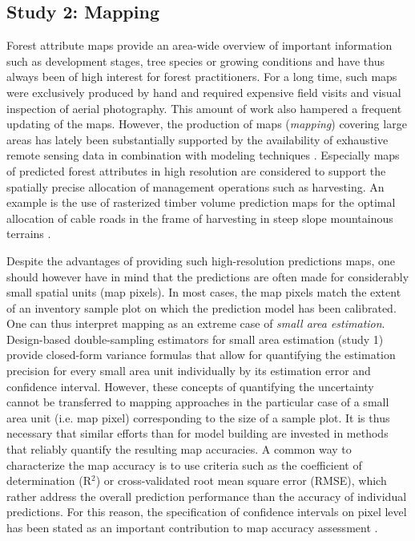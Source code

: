 \subsection{Study 2: Mapping} %
\label{sec:study2}


Forest attribute maps provide an area-wide overview of important information such as development stages, tree species or growing conditions and have thus always been of high interest for forest practitioners. For a long time, such maps were exclusively produced by hand and required expensive field visits and visual inspection of aerial photography. This amount of work also hampered a frequent updating of the maps. However, the production of maps (\textit{mapping}) covering large areas has lately been substantially supported by the availability of exhaustive remote sensing data in combination with modeling techniques \citep{brosofske2014}. Especially maps of predicted forest attributes in high resolution are considered to support the spatially precise allocation of management operations such as harvesting. An example is the use of rasterized timber volume prediction maps for the optimal allocation of cable roads in the frame of harvesting in steep slope mountainous terrains \citep{bont2012, bont2015}.\par

Despite the advantages of providing such high-resolution predictions maps, one should however have in mind that the predictions are often made for considerably small spatial units (map pixels). In most cases, the map pixels match the extent of an inventory sample plot on which the prediction model has been calibrated. One can thus interpret mapping as an extreme case of \textit{small area estimation}. Design-based double-sampling estimators for small area estimation (study 1) provide closed-form variance formulas that allow for quantifying the estimation precision for every small area unit individually by its estimation error and confidence interval. However, these concepts of quantifying the uncertainty cannot be transferred to mapping approaches in the particular case of a small area unit (i.e. map pixel) corresponding to the size of a sample plot. It is thus necessary that similar efforts than for model building are invested in methods that reliably quantify the resulting map accuracies. A common way to characterize the map accuracy is to use criteria such as the coefficient of determination (R$^2$) or cross-validated root mean square error (RMSE), which rather address the overall prediction performance than the accuracy of individual predictions. For this reason, the specification of confidence intervals on pixel level has been stated as an important contribution to map accuracy assessment \citep{mcroberts2010a}.\par


